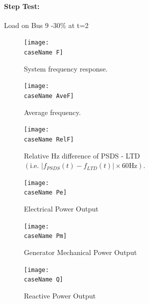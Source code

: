 \documentclass[12pt]{article}
\begin{document}
\paragraph{Step Test:} Load on Bus 9 -30\% at t=2
	\begin{figure}[h!]
			\centering
			\texttt{[image: \\caseName F]}\vspace{-.5em}
			\caption{System frequency response.}
			\label{\caseName F}		 
	\end{figure}%
	\begin{figure}[h!]
			\centering
			\texttt{[image: \\caseName AveF]}\vspace{-.5em}
			\caption{Average frequency.}
			\label{\caseName AveF}		 
	\end{figure}%

	\begin{figure}[h!]
			\centering
			\texttt{[image: \\caseName RelF]}\vspace{-.5em}
			\caption{Relative Hz difference of PSDS - LTD $\left( \text{i.e. }  \left|f_{PSDS}(t)- f_{LTD}(t)\right| \times 60 \text{Hz} \right)$.}
			\label{\caseName RelF}		 
	\end{figure}%
%
\pagebreak
	\begin{figure}[h!]
			\centering
			\texttt{[image: \\caseName Pe]}\vspace{-.5em}
			\caption{Electrical Power Output}
			\label{\caseName Pe}		 
	\end{figure}%
	\begin{figure}[h!]
			\centering
			\texttt{[image: \\caseName Pm]}\vspace{-.5em}
			\caption{Generator Mechanical Power Output}
			\label{\caseName Pm}		 
	\end{figure}%

\pagebreak
	\begin{figure}[h!]
			\centering
			\texttt{[image: \\caseName Q]}\vspace{-.5em}
			\caption{Reactive Power Output}
			\label{\caseName Q}		 
	\end{figure}%
\end{document}
